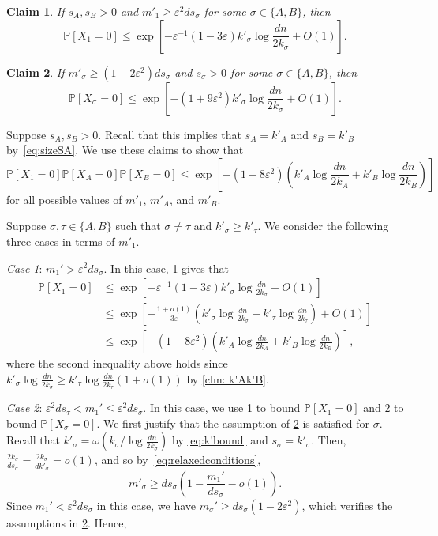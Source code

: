 \documentclass[11pt]{article}
\newcommand{\eps}{\varepsilon}
\def\P{\mathbb P}
\theoremstyle{plain}
\newtheorem{claim}{Claim}[thm]
\begin{document}
\begin{claim}\label{clm: big m1}
If $s_A, s_B > 0$ and $m'_1 \geq \varepsilon^2ds_\sigma$ for some $\sigma \in \{A,B\}$, then
    \[
    \P[X_1= 0] \leq \exp\left[-\eps^{-1}(1 - 3\eps)k'_\sigma\log\frac{dn}{2k_\sigma} + O(1)\right].
    \]
\end{claim}
\begin{claim}\label{clm: small m1}
If $m'_\sigma \geq (1 - 2\eps^2)ds_\sigma$ and $s_\sigma > 0$ for some $\sigma \in \{A,B\}$, then
    \[
    \P[X_\sigma = 0] \leq \exp\left[-(1 + 9\eps^2)k'_\sigma\log\frac{dn}{2k_\sigma}+ O(1)\right].
    \]
\end{claim}

Suppose $s_A, s_B > 0$. Recall that this implies that $s_A = k'_A$ and $s_B = k'_B$ by~\eqref{eq:sizeSA}. We use these claims to show that 
\begin{equation}\label{eq: desired prob}
    \P[X_1 = 0]\P[X_A = 0]\P[X_B = 0] \leq \exp\left[-(1 + 8\eps^2)\left(k'_A\log\frac{dn}{2k_A} + k'_B\log\frac{dn}{2k_B}\right)\right]
\end{equation}
for all possible values of $m'_1$, $m'_A$, and $m'_B$. 

Suppose $\sigma,\tau \in \{A,B\}$ such that $\sigma\neq \tau$ and 
 $k'_\sigma \geq k'_\tau$. We consider the following three cases in terms of $m'_1$.

 {\em Case 1}: $m_1'>\eps^2 ds_{\sigma}$. In this case,  \cref{clm: big m1} gives that 
\begin{align*}
    \P[X_1 = 0] &\leq \exp\left[-\eps^{-1}(1 - 3\eps)k'_\sigma\log\frac{dn}{2k_\sigma}+ O(1)\right]\\
    &\leq \exp\left[-\frac{1 + o(1)}{3\eps}\left( k'_\sigma\log\frac{dn}{2k_\sigma} + k'_\tau\log\frac{dn}{2k_\tau} \right)+ O(1)\right]\\
    &\leq \exp\left[-(1 + 8\eps^2 )\left(k'_A\log\frac{dn}{2k_A} + k'_B\log\frac{dn}{2k_B}\right)\right],
\end{align*}
where the second inequality above holds since
$k'_\sigma\log\frac{dn}{2k_\sigma} \geq k'_\tau\log\frac{dn}{2k_\tau}(1 + o(1))$ by \newline\cref{clm: k'Ak'B}.


{\em Case 2}: $\eps^2 ds_{\tau}< m_1'\le \eps^2 ds_{\sigma}$. In this case, we use \cref{clm: big m1} to bound $\P[X_1 = 0]$ and \cref{clm: small m1} to bound $\P[X_\sigma = 0]$. We first justify that the assumption of \cref{clm: small m1} is satisfied for $\sigma$. Recall that $k'_\sigma = \omega( k_\sigma/\log\frac{dn}{2k_\sigma}) $ by \eqref{eq:k'bound} and $s_{\sigma}=k'_\sigma$. Then,  $\frac{2k_\sigma}{ds_\sigma} = \frac{2k_\sigma}{dk'_\sigma} = o(1)$, and so by~\eqref{eq:relaxedconditions}, 
\begin{equation}
m'_\sigma \geq ds_\sigma\left(1 - \frac{m_1'}{ds_\sigma} - o(1)\right).\label{eq:mprimebound}
\end{equation}
Since $m_1' < \eps^2ds_\sigma$ in this case, we have $m_\sigma' \geq ds_\sigma(1 - 2\eps^2)$, which verifies the assumptions in \cref{clm: small m1}. Hence,
\end{document}
